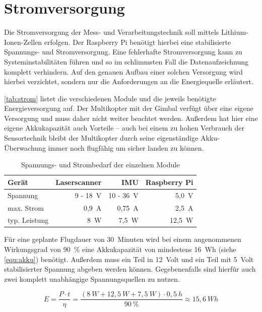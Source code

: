 \documentclass[a4paper,12pt,bibliography=totoc, listof=totoc,titlepage,pointlessnumbers]{scrreprt}
\begin{document}
\section{Stromversorgung}
Die Stromversorgung der Mess- und Ver\-arbei\-tungs\-tech\-nik soll mittels Lithium-Ionen-Zellen erfolgen. Der Rasp\-berry Pi benötigt hierbei eine stabilisierte Spannungs- und Stromversorgung. Eine fehlerhafte Stromversorgung kann zu Systeminstabilitäten führen und so im schlimmsten Fall die Datenaufzeichnung komplett verhindern. Auf den genauen Aufbau einer solchen Versorgung wird hierbei verzichtet, sondern nur die Anforderungen an die Energiequelle erläutert.

\autoref{tab:strom} listet die verschiedenen Module und die jeweils benötigte Energieversorgung auf. Der Multikopter mit der Gimbal verfügt über eine eigene Versorgung und muss daher nicht weiter beachtet werden. Außerdem hat hier eine eigene Akkukapazität auch Vorteile -- auch bei einem zu hohen Verbrauch der Sensortechnik bleibt der Multikopter durch seine eigenständige Akku-Überwachung immer noch flugfähig um sicher landen zu können.

\begin{table}[!ht]
\centering
\begin{tabular}{ l | r | r | r }
  Gerät 	& Laser\-scan\-ner	& IMU		& Rasp\-berry Pi\\
  \hline
  Spannung 	& 9 - 18~V 	& 10 - 36~V	& 5,0~V \\
  \hline
  max. Strom 	& 0,9~A		& 0,75~A	& 2,5~A \\
  \hline
  typ. Leistung	& 8~W		& 7,5~W		& 12,5~W 
\end{tabular}
\caption{Spannungs- und Strombedarf der einzelnen Module \citep{vlpSheet,imar,raspSheet}}
\label{tab:strom}
\end{table}

Für eine geplante Flugdauer von 30~Minuten wird bei einem angenommenen Wirkungsgrad von 90~\% eine Akkukapazität von mindestens 16~Wh (siehe \autoref{equ:akku}) benötigt. Außerdem muss ein Teil in 12~Volt und ein Teil mit 5~Volt stabilisierter Spannung abgeben werden können. Gegebenenfalls sind hierfür auch zwei komplett unabhängige Spannungsquellen zu nutzen.

\begin{equation}
\label{equ:akku}
E = \frac{ P \cdot t}{\eta} = \frac{(8~W + 12,5~W + 7,5~W) \cdot 0,5~h}{90~\%} \approx 15,6~Wh
\end{equation}
\end{document}
